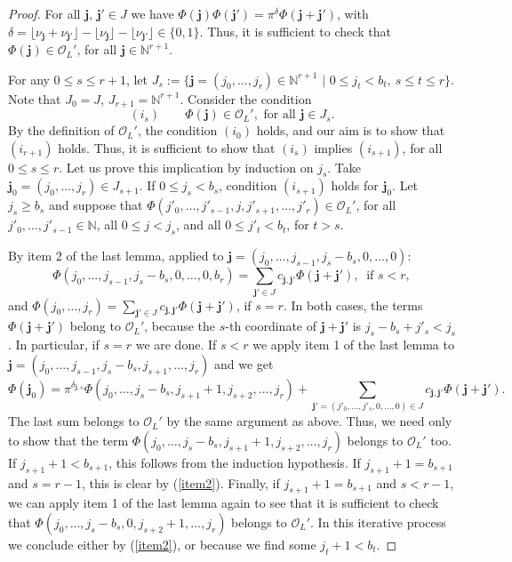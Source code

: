 \documentclass{amsart}
\newcommand{\N}{\mathbb N}
\def\j{\mathbf{j}}
\def\ol{{\mathcal O}_L}
\def\tq{\,\,|\,\,}
\begin{document}
\begin{proof}
For all $\j,\,\j'\in J$ we have $\Phi(\j)\Phi(\j')=\pi^{\delta}\Phi(\j+\j')$, with $\delta=\lfloor\nu_\j+\nu_{\j'}\rfloor-\lfloor\nu_\j\rfloor-\lfloor\nu_{\j'}\rfloor\in\{0,1\}$. Thus, it is sufficient to check that $\Phi(\j)\in\ol'$, for all $\j\in\N^{r+1}$.

For any $0\le s\le r+1$, let $J_s:=\{\j=(j_0,\dots,j_r)\in\N^{r+1}\tq 0\le j_t<b_t,\ s\le t\le r\}$. Note that $J_0=J$, $J_{r+1}=\N^{r+1}$. Consider the condition
$$(i_s)\qquad \Phi(\j)\in\ol', \mbox{ for all }\j\in J_s.$$
By the definition of $\ol'$, the condition $(i_0)$ holds, and our aim is to show that $(i_{r+1})$ holds. Thus, it is sufficient to show that $(i_s)$ implies $(i_{s+1})$, for all $0\le s\le r$. Let us prove this implication by induction on $j_s$. Take $\j_0=(j_0,\dots,j_r)\in J_{s+1}$. If $0\le j_s<b_s$, condition $(i_{s+1})$ holds for $\j_0$. Let $j_s\ge b_s$ and suppose that $\Phi(j'_0,\dots,j'_{s-1},j,j'_{s+1},\dots,j'_r)\in\ol'$, for all $j'_0,\dots,j'_{s-1}\in\N$, all $0\le j<j_s$, and  all $0\le j'_t<b_t$, for $t>s$. 

By item 2 of the last lemma, applied to $\j=(j_0,\dots,j_{s-1},j_s-b_s,0,\dots,0)$:
\begin{equation}\label{item2}
 \Phi(j_0,\dots,j_{s-1},j_s-b_s,0,\dots,0,b_r)=\sum_{\j'\in J}
c_{\j,\j'}\Phi(\j+\j'),\ \mbox{ if }s<r,
\end{equation}
and $\Phi(j_0,\dots,j_r)=\sum_{\j'\in J}
c_{\j,\j'}\Phi(\j+\j')$, if $s=r$. In both cases, the terms $\Phi(\j+\j')$ belong to $\ol'$, because the $s$-th coordinate of $\j+\j'$ is $j_s-b_s+j'_s<j_s$. In particular, if $s=r$ we are done. If $s<r$ we apply
 item 1 of the last lemma to $\j=(j_0,\dots,j_{s-1},j_s-b_s,j_{s+1},\dots,j_r)$ and we get
$$\Phi(\j_0)=\pi^{\delta_{\j,s}}
\Phi(j_0,\dots,j_s-b_s,j_{s+1}+1,j_{s+2},\dots,j_r)+\sum_{\j'=(j'_0,\dots,j'_s,0,\dots,0)\in J}
c_{\j,\j'}\Phi(\j+\j').$$
The last sum belongs to $\ol'$ by the same argument as above. Thus, we need only to show that the term $\Phi(j_0,\dots,j_s-b_s,j_{s+1}+1,j_{s+2},\dots,j_r)$ belongs to $\ol'$ too. If $j_{s+1}+1<b_{s+1}$, this follows from the induction hypothesis. If $j_{s+1}+1=b_{s+1}$ and $s=r-1$, this is clear by (\ref{item2}). Finally, if $j_{s+1}+1=b_{s+1}$ and $s<r-1$, we can apply item 1 of the last lemma again to see that it is sufficient to check that $\Phi(j_0,\dots,j_s-b_s,0,j_{s+2}+1,\dots,j_r)$ belongs to $\ol'$. In this iterative process we conclude either by (\ref{item2}), or because we find some $j_t+1<b_t$.
\end{proof}
\end{document}
